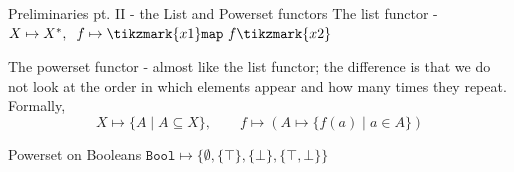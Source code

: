 \documentclass[aspectratio=169]{beamer}
\begin{document}
\begin{frame}{Preliminaries pt. II - the List and Powerset functors}
  The list functor - $X \mapsto X^\ast, \hspace{0.2cm} f \mapsto \tikzmark{x1}
  \prog{map}\ f \tikzmark{x2}$

  \vspace{1cm}
  The powerset functor - almost like the list functor; the difference
  is that we do not look at the order in which elements appear and
  how many times they repeat. Formally,
  \[
    X \mapsto \{ A \mid A \subseteq X \}, \qquad f \mapsto
    (A \mapsto \{ f(a) \mid a \in A \})
  \]

  \begin{exampleblock}{\exercise Powerset on Booleans}
    $\mathtt{Bool} \mapsto \{ \emptyset, \{ \top \}, \{ \bot \}, \{ \top, \bot \} \}$
  \end{exampleblock}
  

\end{frame}
\end{document}
